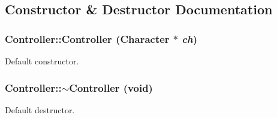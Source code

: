 \subsection{Constructor \& Destructor Documentation}
\hypertarget{classCartWheel_1_1Core_1_1Controller_a30666051b1d61857eb778c906e3936a6}{
\subsubsection[{Controller}]{\setlength{\rightskip}{0pt plus 5cm}Controller::Controller ({\bf Character} $\ast$ {\em ch})}}
\label{classCartWheel_1_1Core_1_1Controller_a30666051b1d61857eb778c906e3936a6}
Default constructor. \hypertarget{classCartWheel_1_1Core_1_1Controller_a3d53864db248f17f2443df8388053f9d}{
\subsubsection[{$\sim$Controller}]{\setlength{\rightskip}{0pt plus 5cm}Controller::$\sim$Controller (void)}}
\label{classCartWheel_1_1Core_1_1Controller_a3d53864db248f17f2443df8388053f9d}
Default destructor. 

